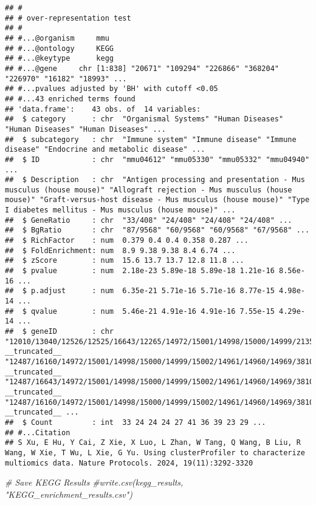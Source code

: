 \documentclass[
]{article}
\newenvironment{Shaded}{\begin{snugshade}}{\end{snugshade}}
\newcommand{\CommentTok}[1]{\textcolor[rgb]{0.56,0.35,0.01}{\textit{#1}}}
\begin{document}
\begin{verbatim}
## #
## # over-representation test
## #
## #...@organism     mmu 
## #...@ontology     KEGG 
## #...@keytype      kegg 
## #...@gene     chr [1:838] "20671" "109294" "226866" "368204" "226970" "16182" "18993" ...
## #...pvalues adjusted by 'BH' with cutoff <0.05 
## #...43 enriched terms found
## 'data.frame':    43 obs. of  14 variables:
##  $ category      : chr  "Organismal Systems" "Human Diseases" "Human Diseases" "Human Diseases" ...
##  $ subcategory   : chr  "Immune system" "Immune disease" "Immune disease" "Endocrine and metabolic disease" ...
##  $ ID            : chr  "mmu04612" "mmu05330" "mmu05332" "mmu04940" ...
##  $ Description   : chr  "Antigen processing and presentation - Mus musculus (house mouse)" "Allograft rejection - Mus musculus (house mouse)" "Graft-versus-host disease - Mus musculus (house mouse)" "Type I diabetes mellitus - Mus musculus (house mouse)" ...
##  $ GeneRatio     : chr  "33/408" "24/408" "24/408" "24/408" ...
##  $ BgRatio       : chr  "87/9568" "60/9568" "60/9568" "67/9568" ...
##  $ RichFactor    : num  0.379 0.4 0.4 0.358 0.287 ...
##  $ FoldEnrichment: num  8.9 9.38 9.38 8.4 6.74 ...
##  $ zScore        : num  15.6 13.7 13.7 12.8 11.8 ...
##  $ pvalue        : num  2.18e-23 5.89e-18 5.89e-18 1.21e-16 8.56e-16 ...
##  $ p.adjust      : num  6.35e-21 5.71e-16 5.71e-16 8.77e-15 4.98e-14 ...
##  $ qvalue        : num  5.46e-21 4.91e-16 4.91e-16 7.55e-15 4.29e-14 ...
##  $ geneID        : chr  "12010/13040/12526/12525/16643/12265/14972/15001/14998/15000/14999/21354/21355/15002/14961/14960/14969/381091/15"| __truncated__ "12487/16160/14972/15001/14998/15000/14999/15002/14961/14960/14969/381091/15006/15013/15015/110557/15018/110558/"| __truncated__ "12487/16643/14972/15001/14998/15000/14999/15002/14961/14960/14969/381091/15006/15013/15015/110557/15018/110558/"| __truncated__ "12487/16160/14972/15001/14998/15000/14999/15002/14961/14960/14969/381091/15006/15013/15015/110557/15018/110558/"| __truncated__ ...
##  $ Count         : int  33 24 24 24 27 41 36 39 23 29 ...
## #...Citation
## S Xu, E Hu, Y Cai, Z Xie, X Luo, L Zhan, W Tang, Q Wang, B Liu, R Wang, W Xie, T Wu, L Xie, G Yu. Using clusterProfiler to characterize multiomics data. Nature Protocols. 2024, 19(11):3292-3320
\end{verbatim}

\begin{Shaded}
\begin{Highlighting}[]
\CommentTok{\# Save KEGG Results}
\CommentTok{\#write.csv(kegg\_results, "KEGG\_enrichment\_results.csv")}
\end{Highlighting}
\end{Shaded}
\end{document}

